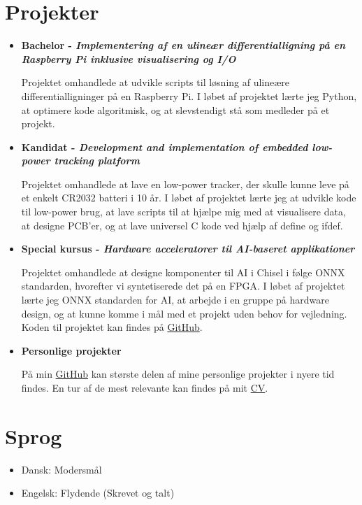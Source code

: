 \section{Projekter}
	\begin{itemize}
		\item \textbf{Bachelor - \textit{Implementering af en ulineær differentialligning på en Raspberry Pi inklusive visualisering og I/O}}

			Projektet omhandlede at udvikle scripts til løsning af ulineære differentialligninger på en Raspberry Pi.
			I løbet af projektet lærte jeg Python, at optimere kode algoritmisk, og at slevstendigt stå som medleder på et projekt.

		\item \textbf{Kandidat - \textit{Development and implementation of embedded low-power tracking platform}}

			Projektet omhandlede at lave en low-power tracker, der skulle kunne leve på et enkelt CR2032 batteri i 10 år.
			I løbet af projektet lærte jeg at udvikle kode til low-power brug, at lave scripts til at hjælpe mig med at visualisere data, at designe PCB'er, og at lave universel C kode ved hjælp af define og ifdef.

		\item \textbf{Special kursus - \textit{Hardware acceleratorer til AI-baseret applikationer}}

			Projektet omhandlede at designe komponenter til AI i Chisel i følge ONNX standarden, hvorefter vi syntetiserede det på en FPGA.
			I løbet af projektet lærte jeg ONNX standarden for AI, at arbejde i en gruppe på hardware design, og at kunne komme i mål med et projekt uden behov for vejledning.
			Koden til projektet kan findes på \href{https://github.com/jondalnas/Hardware-Accelerated-Neural-Network}{GitHub}.

		\item \textbf{Personlige projekter}
			
			På min \href{https://github.com/jondalnas}{GitHub} kan største delen af mine personlige projekter i nyere tid findes.
			En tur af de mest relevante kan findes på mit \href{https://github.com/jondalnas/CV}{CV}.
	\end{itemize}

\section{Sprog}
	\begin{itemize}
		\item Dansk: Modersmål
		\item Engelsk: Flydende (Skrevet og talt)
	\end{itemize}

